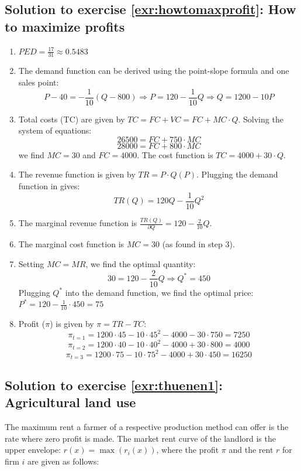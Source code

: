 \documentclass[
  12pt,
  oneside]{book}
\providecommand{\tightlist}{%
  \setlength{\itemsep}{0pt}\setlength{\parskip}{0pt}}
\theoremstyle{definition}
\theoremstyle{definition}
\theoremstyle{definition}
\theoremstyle{definition}
\theoremstyle{remark}
\begin{document}
\subsection*{Solution to exercise \ref{exr:howtomaxprofit}: How to maximize profits}\label{sol:howtomaxprofit}

\begin{enumerate}
\def\labelenumi{\arabic{enumi}.}
\tightlist
\item
  \(PED=\frac{17}{31} \approx 0.5483\)
\item
  The demand function can be derived using the point-slope formula and one sales point:
  \[P-40=-\frac{1}{10}(Q-800) \Rightarrow P=120-\frac{1}{10}Q \Rightarrow Q=1200-10P\]
\item
  Total costs (TC) are given by \(TC=FC+VC=FC+MC \cdot Q\). Solving the system of equations:
  \[26500=FC+750 \cdot MC\]
  \[28000=FC+800 \cdot MC\]
  we find \(MC=30\) and \(FC=4000\). The cost function is \(TC=4000+30 \cdot Q\).
\item
  The revenue function is given by \(TR=P \cdot Q(P)\). Plugging the demand function in gives:
  \[TR(Q)=120Q-\frac{1}{10}Q^2\]
\item
  The marginal revenue function is \(\frac{TR(Q)}{\partial Q}=120-\frac{2}{10}Q\).
\item
  The marginal cost function is \(MC=30\) (as found in step 3).
\item
  Setting \(MC=MR\), we find the optimal quantity:
  \[30=120-\frac{2}{10}Q \Rightarrow Q^*=450\]
  Plugging \(Q^*\) into the demand function, we find the optimal price:
  \(P^*=120-\frac{1}{10} \cdot 450 = 75\)
\item
  Profit (\(\pi\)) is given by \(\pi=TR-TC\):
  \[\pi_{t=1}=1200 \cdot 45-10 \cdot 45^2-4000-30 \cdot 750 = 7250\]
  \[\pi_{t=2}=1200 \cdot 40-10 \cdot 40^2-4000+30 \cdot 800 = 4000\]
  \[\pi_{t=3}=1200 \cdot 75-10 \cdot 75^2-4000+30 \cdot 450 = 16250\]
\end{enumerate}

\subsection*{Solution to exercise \ref{exr:thuenen1}: Agricultural land use}\label{sol:thuenen1}

The maximum rent a farmer of a respective production method can offer is the rate where zero profit is made. The market rent curve of the landlord is the upper envelope: \(r(x) = \max(r_i(x))\), where the profit \(\pi\) and the rent \(r\) for firm \(i\) are given as follows:
\end{document}

